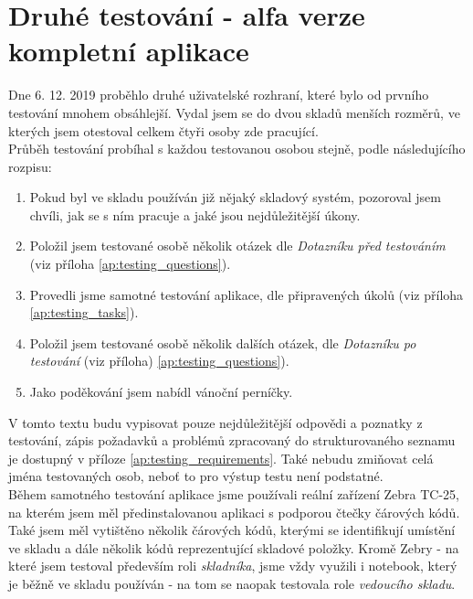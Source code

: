 \section{Druhé testování - alfa verze kompletní aplikace}\label{sec:usertest}

Dne 6. 12. 2019 proběhlo druhé uživatelské rozhraní, které bylo od prvního testování mnohem obsáhlejší. Vydal jsem se do dvou skladů menších rozměrů, ve kterých jsem otestoval celkem čtyři osoby zde pracující.\\
Průběh testování probíhal s každou testovanou osobou stejně, podle následujícího rozpisu:
\begin{enumerate}
	\item Pokud byl ve skladu používán již nějaký skladový systém, pozoroval jsem chvíli, jak se s ním pracuje a jaké jsou nejdůležitější úkony.
	\item Položil jsem testované osobě několik otázek dle \emph{Dotazníku před testováním} (viz příloha \ref{ap:testing_questions}).
	\item Provedli jsme samotné testování aplikace, dle připravených úkolů (viz příloha \ref{ap:testing_tasks}).
	\item Položil jsem testované osobě několik dalších otázek, dle \emph{Dotazníku po testování} (viz příloha) \ref{ap:testing_questions}).
	\item Jako poděkování jsem nabídl vánoční perníčky.
\end{enumerate}

V tomto textu budu vypisovat pouze nejdůležitější odpovědi a poznatky z testování, zápis požadavků a problémů zpracovaný do strukturovaného seznamu je dostupný v příloze \ref{ap:testing_requirements}. Také nebudu zmiňovat celá jména testovaných osob, neboť to pro výstup testu není podstatné.
\\
Během samotného testování aplikace jsme používali reální zařízení Zebra TC-25, na kterém jsem měl předinstalovanou aplikaci s podporou čtečky čárových kódů. Také jsem měl vytištěno několik čárových kódů, kterými se identifikují umístění ve skladu a dále několik kódů reprezentující skladové položky. Kromě Zebry - na které jsem testoval především roli \emph{skladníka}, jsme vždy využili i notebook, který je běžně ve skladu používán - na tom se naopak testovala role \emph{vedoucího skladu}.


